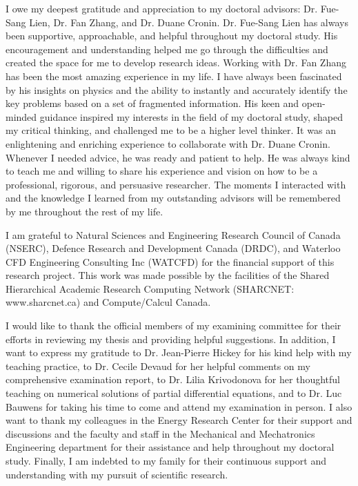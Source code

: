\begin{acknowledgements}

    I owe my deepest gratitude and appreciation to my doctoral advisors: Dr. Fue-Sang Lien, Dr. Fan Zhang, and Dr. Duane Cronin. Dr. Fue-Sang Lien has always been supportive, approachable, and helpful throughout my doctoral study. His encouragement and understanding helped me go through the difficulties and created the space for me to develop research ideas. Working with Dr. Fan Zhang has been the most amazing experience in my life. I have always been fascinated by his insights on physics and the ability to instantly and accurately identify the key problems based on a set of fragmented information. His keen and open-minded guidance inspired my interests in the field of my doctoral study, shaped my critical thinking, and challenged me to be a higher level thinker. It was an enlightening and enriching experience to collaborate with Dr. Duane Cronin. Whenever I needed advice, he was ready and patient to help. He was always kind to teach me and willing to share his experience and vision on how to be a professional, rigorous, and persuasive researcher. The moments I interacted with and the knowledge I learned from my outstanding advisors will be remembered by me throughout the rest of my life.

    I am grateful to Natural Sciences and Engineering Research Council of Canada (NSERC), Defence Research and Development Canada (DRDC), and Waterloo CFD Engineering Consulting Inc (WATCFD) for the financial support of this research project. This work was made possible by the facilities of the Shared Hierarchical Academic Research Computing Network (SHARCNET: www.sharcnet.ca) and Compute/Calcul Canada.

    I would like to thank the official members of my examining committee for their efforts in reviewing my thesis and providing helpful suggestions. In addition, I want to express my gratitude to Dr. Jean-Pierre Hickey for his kind help with my teaching practice, to Dr. Cecile Devaud for her helpful comments on my comprehensive examination report, to Dr. Lilia Krivodonova for her thoughtful teaching on numerical solutions of partial differential equations, and to Dr. Luc Bauwens for taking his time to come and attend my examination in person. I also want to thank my colleagues in the Energy Research Center for their support and discussions and the faculty and staff in the Mechanical and Mechatronics Engineering department for their assistance and help throughout my doctoral study. Finally, I am indebted to my family for their continuous support and understanding with my pursuit of scientific research.

\end{acknowledgements}
